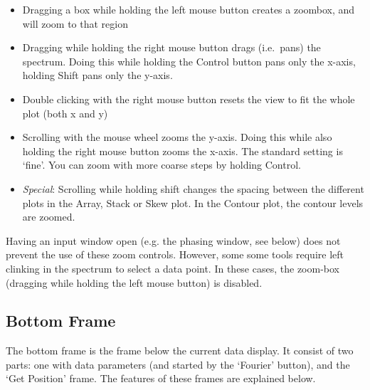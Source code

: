 \documentclass[11pt,a4paper]{article}
\begin{document}
\begin{itemize}
\item Dragging a box while holding the left mouse button creates a zoombox, and will zoom to that region
\item Dragging while holding the right mouse button drags (i.e.\ pans) the spectrum. Doing this while holding the Control button pans only the x-axis, holding Shift pans only the y-axis.
\item Double clicking with the right mouse button resets the view to fit the whole plot (both x and y)
\item Scrolling with the mouse wheel zooms the y-axis. Doing this while also holding the right mouse button zooms the x-axis. The standard setting is `fine'. You can zoom with more coarse steps by holding Control.
\item \textit{Special}: Scrolling while holding shift changes the spacing between the different plots in the Array, Stack or Skew plot. In the Contour plot, the contour levels are zoomed.
\end{itemize}

Having an input window open (e.g. the phasing window, see below) does not prevent the use of these zoom controls. However, some some tools require left clinking in the spectrum to select a data point. In these cases, the zoom-box (dragging while holding the left mouse button) is disabled.

\subsection{Bottom Frame}
The bottom frame is the frame below the current data display. It consist of two parts: one with data parameters (and started by the `Fourier' button), and the `Get Position' frame. The features of these frames are explained below.
\end{document}
